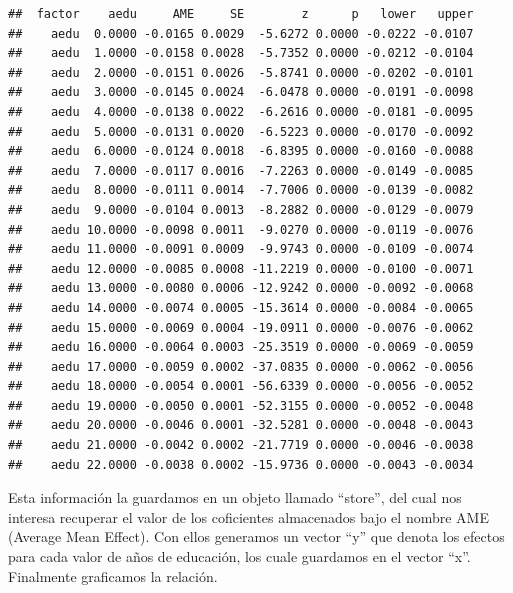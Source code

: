 \documentclass[
]{book}
\newenvironment{Shaded}{\begin{snugshade}}{\end{snugshade}}
\newcommand{\AttributeTok}[1]{\textcolor[rgb]{0.77,0.63,0.00}{#1}}
\newcommand{\DecValTok}[1]{\textcolor[rgb]{0.00,0.00,0.81}{#1}}
\newcommand{\FunctionTok}[1]{\textcolor[rgb]{0.00,0.00,0.00}{#1}}
\newcommand{\NormalTok}[1]{#1}
\newcommand{\OtherTok}[1]{\textcolor[rgb]{0.56,0.35,0.01}{#1}}
\newcommand{\SpecialCharTok}[1]{\textcolor[rgb]{0.00,0.00,0.00}{#1}}
\newcommand{\StringTok}[1]{\textcolor[rgb]{0.31,0.60,0.02}{#1}}
\begin{document}
\begin{verbatim}
##  factor    aedu     AME     SE        z      p   lower   upper
##    aedu  0.0000 -0.0165 0.0029  -5.6272 0.0000 -0.0222 -0.0107
##    aedu  1.0000 -0.0158 0.0028  -5.7352 0.0000 -0.0212 -0.0104
##    aedu  2.0000 -0.0151 0.0026  -5.8741 0.0000 -0.0202 -0.0101
##    aedu  3.0000 -0.0145 0.0024  -6.0478 0.0000 -0.0191 -0.0098
##    aedu  4.0000 -0.0138 0.0022  -6.2616 0.0000 -0.0181 -0.0095
##    aedu  5.0000 -0.0131 0.0020  -6.5223 0.0000 -0.0170 -0.0092
##    aedu  6.0000 -0.0124 0.0018  -6.8395 0.0000 -0.0160 -0.0088
##    aedu  7.0000 -0.0117 0.0016  -7.2263 0.0000 -0.0149 -0.0085
##    aedu  8.0000 -0.0111 0.0014  -7.7006 0.0000 -0.0139 -0.0082
##    aedu  9.0000 -0.0104 0.0013  -8.2882 0.0000 -0.0129 -0.0079
##    aedu 10.0000 -0.0098 0.0011  -9.0270 0.0000 -0.0119 -0.0076
##    aedu 11.0000 -0.0091 0.0009  -9.9743 0.0000 -0.0109 -0.0074
##    aedu 12.0000 -0.0085 0.0008 -11.2219 0.0000 -0.0100 -0.0071
##    aedu 13.0000 -0.0080 0.0006 -12.9242 0.0000 -0.0092 -0.0068
##    aedu 14.0000 -0.0074 0.0005 -15.3614 0.0000 -0.0084 -0.0065
##    aedu 15.0000 -0.0069 0.0004 -19.0911 0.0000 -0.0076 -0.0062
##    aedu 16.0000 -0.0064 0.0003 -25.3519 0.0000 -0.0069 -0.0059
##    aedu 17.0000 -0.0059 0.0002 -37.0835 0.0000 -0.0062 -0.0056
##    aedu 18.0000 -0.0054 0.0001 -56.6339 0.0000 -0.0056 -0.0052
##    aedu 19.0000 -0.0050 0.0001 -52.3155 0.0000 -0.0052 -0.0048
##    aedu 20.0000 -0.0046 0.0001 -32.5281 0.0000 -0.0048 -0.0043
##    aedu 21.0000 -0.0042 0.0002 -21.7719 0.0000 -0.0046 -0.0038
##    aedu 22.0000 -0.0038 0.0002 -15.9736 0.0000 -0.0043 -0.0034
\end{verbatim}

Esta información la guardamos en un objeto llamado ``store'', del cual nos interesa recuperar el valor de los coficientes almacenados bajo el nombre AME (Average Mean Effect). Con ellos generamos un vector ``y'' que denota los efectos para cada valor de años de educación, los cuale guardamos en el vector ``x''. Finalmente graficamos la relación.

\begin{Shaded}
\end{Shaded}
\end{document}
